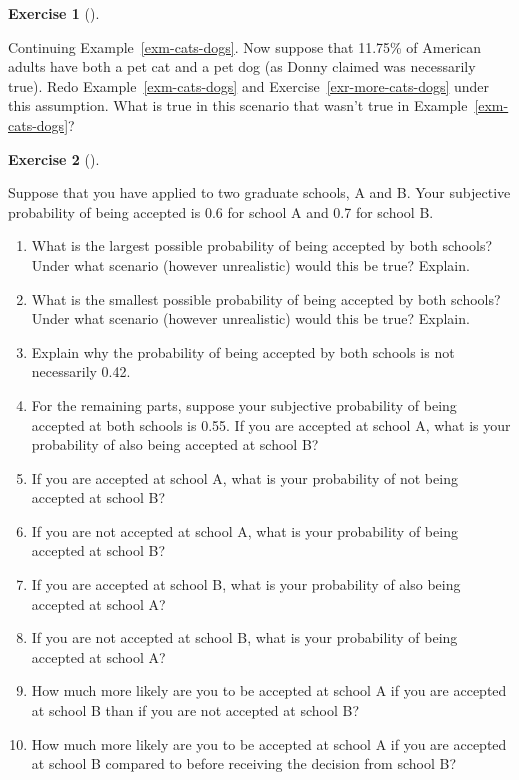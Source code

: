 \documentclass[
  letterpaper,
  DIV=11,
  numbers=noendperiod]{scrreprt}
\providecommand{\tightlist}{%
  \setlength{\itemsep}{0pt}\setlength{\parskip}{0pt}}
\theoremstyle{plain}
\theoremstyle{definition}
\theoremstyle{definition}
\newtheorem{exercise}{Exercise}[chapter]
\theoremstyle{definition}
\theoremstyle{remark}
\begin{document}
\begin{exercise}[]\protect\hypertarget{exr-more-cats-dogs-2}{}\label{exr-more-cats-dogs-2}

Continuing Example~\ref{exm-cats-dogs}. Now suppose that 11.75\% of
American adults have both a pet cat and a pet dog (as Donny claimed was
necessarily true). Redo Example~\ref{exm-cats-dogs} and
Exercise~\ref{exr-more-cats-dogs} under this assumption. What is true in
this scenario that wasn't true in Example~\ref{exm-cats-dogs}?

\end{exercise}

\begin{exercise}[]\protect\hypertarget{exr-grad-school-two-way}{}\label{exr-grad-school-two-way}

Suppose that you have applied to two graduate schools, A and B. Your
subjective probability of being accepted is 0.6 for school A and 0.7 for
school B.

\begin{enumerate}
\def\labelenumi{\arabic{enumi}.}
\tightlist
\item
  What is the largest possible probability of being accepted by both
  schools? Under what scenario (however unrealistic) would this be true?
  Explain.
\item
  What is the smallest possible probability of being accepted by both
  schools? Under what scenario (however unrealistic) would this be true?
  Explain.
\item
  Explain why the probability of being accepted by both schools is not
  necessarily 0.42.
\item
  For the remaining parts, suppose your subjective probability of being
  accepted at both schools is 0.55. If you are accepted at school A,
  what is your probability of also being accepted at school B?
\item
  If you are accepted at school A, what is your probability of not being
  accepted at school B?
\item
  If you are not accepted at school A, what is your probability of being
  accepted at school B?
\item
  If you are accepted at school B, what is your probability of also
  being accepted at school A?
\item
  If you are not accepted at school B, what is your probability of being
  accepted at school A?
\item
  How much more likely are you to be accepted at school A if you are
  accepted at school B than if you are not accepted at school B?
\item
  How much more likely are you to be accepted at school A if you are
  accepted at school B compared to before receiving the decision from
  school B?
\end{enumerate}

\end{exercise}
\end{document}
